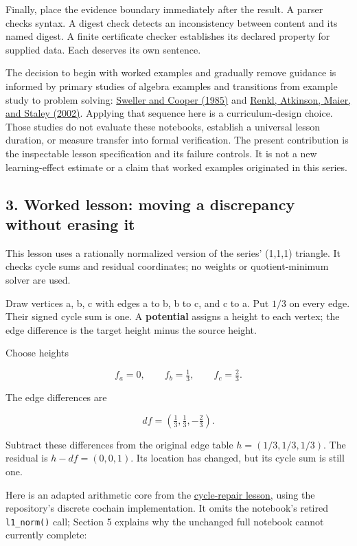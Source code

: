 \documentclass[
  11pt,
]{article}
\begin{document}
Finally, place the evidence boundary immediately after the result. A
parser checks syntax. A digest check detects an inconsistency between
content and its named digest. A finite certificate checker establishes
its declared property for supplied data. Each deserves its own sentence.

The decision to begin with worked examples and gradually remove guidance
is informed by primary studies of algebra examples and transitions from
example study to problem solving:
\href{https://www.tandfonline.com/doi/abs/10.1207/s1532690xci0201_3}{Sweller
and Cooper (1985)} and
\href{https://doi.org/10.1080/00220970209599510}{Renkl, Atkinson, Maier,
and Staley (2002)}. Applying that sequence here is a curriculum-design
choice. Those studies do not evaluate these notebooks, establish a
universal lesson duration, or measure transfer into formal verification.
The present contribution is the inspectable lesson specification and its
failure controls. It is not a new learning-effect estimate or a claim
that worked examples originated in this series.

\hypertarget{worked-lesson-moving-a-discrepancy-without-erasing-it}{%
\subsection{3. Worked lesson: moving a discrepancy without erasing
it}\label{worked-lesson-moving-a-discrepancy-without-erasing-it}}

This lesson uses a rationally normalized version of the series' (1,1,1)
triangle. It checks cycle sums and residual coordinates; no weights or
quotient-minimum solver are used.

Draw vertices a, b, c with edges a to b, b to c, and c to a. Put \(1/3\)
on every edge. Their signed cycle sum is one. A \textbf{potential}
assigns a height to each vertex; the edge difference is the target
height minus the source height.

Choose heights

\[
f_a=0,\qquad f_b=\tfrac13,\qquad f_c=\tfrac23.
\]

The edge differences are

\[
df=(\tfrac13,\tfrac13,-\tfrac23).
\]

Subtract these differences from the original edge table
\(h=(1/3,1/3,1/3)\). The residual is \(h-df=(0,0,1)\). Its location has
changed, but its cycle sum is still one.

Here is an adapted arithmetic core from the
\href{https://github.com/dbccpage/the_symbol_game/blob/52cb5457f6c485ba548cfd292f6012a941ed22cf/omega_engine_education/the_symbol_game/lessons/system_integration/100_novices/04_cycle_repair.ipynb}{cycle-repair
lesson}, using the repository's discrete cochain implementation. It
omits the notebook's retired \texttt{\nolinkurl{l1_norm()}} call;
Section 5 explains why the unchanged full notebook cannot currently
complete:
\end{document}
